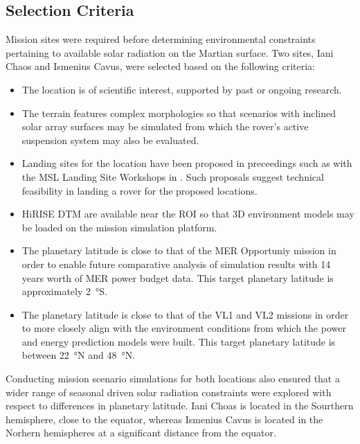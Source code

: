 \subsection{Selection Criteria}
\label{sec:MissionSites:SelectionCriteria}
Mission sites were required before determining environmental constraints pertaining to available solar radiation on the Martian surface. Two sites, Iani Chaos and Ismenius Cavus, were selected based on the following criteria:

\begin{itemize}
    \item The location is of scientific interest, supported by past or ongoing research.
    \item The terrain features complex morphologies so that scenarios with inclined solar array surfaces may be simulated from which the rover's active suspension system may also be evaluated.
    \item Landing sites for the location have been proposed in preceedings such as with the \ac{MSL} Landing Site Workshops in . Such proposals suggest technical feasibility in landing a rover for the proposed locations.
    \item \ac{HiRISE} \ac{DTM} are available near the \ac{ROI} so that 3D environment models may be loaded on the mission simulation platform.
    \item The planetary latitude is close to that of the \ac{MER} Opportuniy mission in order to enable future comparative analysis of simulation results with 14 years worth of \ac{MER} power budget data. This target planetary latitude is approximately \SI{2}{\degree}S.
    \item The planetary latitude is close to that of the \ac{VL1} and \ac{VL2} missions in order to more closely align with the environment conditions from which the power and energy prediction models were built. This target planetary latitude is between \SI{22}{\degree}N and \SI{48}{\degree}N.
\end{itemize}

Conducting mission scenario simulations for both locations also ensured that a wider range of seasonal driven solar radiation constraints were explored with respect to differences in planetary latitude. Iani Choas is located in the Sourthern hemisphere, close to the equator, whereas Ismenius Cavus is located in the Norhern hemispheres at a significant distance from the equator.

